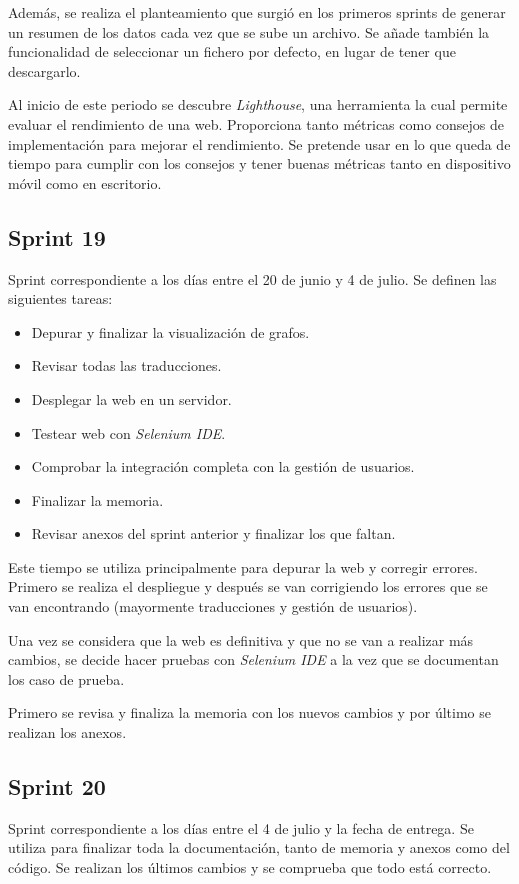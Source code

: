 Además, se realiza el planteamiento que surgió en los primeros sprints de generar un resumen de los datos cada vez que se sube un archivo. Se añade también la funcionalidad de seleccionar un fichero por defecto, en lugar de tener que descargarlo.

Al inicio de este periodo se descubre \textit{Lighthouse}, una herramienta la cual permite evaluar el rendimiento de una web. Proporciona tanto métricas como consejos de implementación para mejorar el rendimiento. Se pretende usar en lo que queda de tiempo para cumplir con los consejos y tener buenas métricas tanto en dispositivo móvil como en escritorio.

\subsection{Sprint 19}
Sprint correspondiente a los días entre el 20 de junio y 4 de julio. Se definen las siguientes tareas:
\begin{itemize}
	\item Depurar y finalizar la visualización de grafos.
	\item Revisar todas las traducciones.
	\item Desplegar la web en un servidor.
	\item Testear web con \textit{Selenium IDE}.
	\item Comprobar la integración completa con la gestión de usuarios.
	\item Finalizar la memoria.
	\item Revisar anexos del sprint anterior y finalizar los que faltan.
\end{itemize}

Este tiempo se utiliza principalmente para depurar la web y corregir errores. Primero se realiza el despliegue y después se van corrigiendo los errores que se van encontrando (mayormente traducciones y gestión de usuarios). 

Una vez se considera que la web es definitiva y que no se van a realizar más cambios, se decide hacer pruebas con \textit{Selenium IDE} a la vez que se documentan los caso de prueba.

Primero se revisa y finaliza la memoria con los nuevos cambios y por último se realizan los anexos.

\subsection{Sprint 20}
Sprint correspondiente a los días entre el 4 de julio y la fecha de entrega. Se utiliza para finalizar toda la documentación, tanto de memoria y anexos como del código. Se realizan los últimos cambios y se comprueba que todo está correcto.

